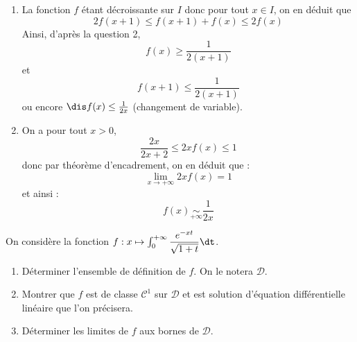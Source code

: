 \documentclass[a4paper,10pt]{report}
\begin{document}
\begin{enumerate}
	\item La fonction $f$ \'etant d\'ecroissante sur $I$ donc pour tout $x \in I$, on en d\'eduit que 
	$$2f(x+1) \le f(x+1)+f(x) \le 2f(x)$$
Ainsi, d'après la question 2, 
$$f(x)\ge \frac1{2(x+1)}$$
 et $$f(x+1) \le \frac1{2(x+1)}$$
ou encore $\dis f(x) \le \frac1{2x}$ (changement de variable).

	\item On a pour tout $x>0$,
$$\frac{2x}{2x+2} \le 2xf(x) \le 1$$ 
donc par théorème d'encadrement, on en déduit que :
$$\lim\limits_{x\to+\infty}2xf(x)=1$$
et ainsi :
$$ f(x) \underset{+\infty}\sim \frac1{2x}$$
	\end{enumerate}



\begin{Exercice}{} On considère la fonction $f : x \mapsto \int_0^{+ \infty} \dfrac{e^{-xt}}{\sqrt{1+t}} \dt$.
\begin{enumerate}
\item Déterminer l'ensemble de définition de $f$. On le notera $\mathcal{D}$.
\item Montrer que $f$ est de classe $\mathcal{C}^1$ sur $\mathcal{D}$ et est solution d'équation différentielle linéaire que l'on précisera.
\item Déterminer les limites de $f$ aux bornes de $\mathcal{D}$.
\end{enumerate}
\end{Exercice}

\corr 
\end{document}
